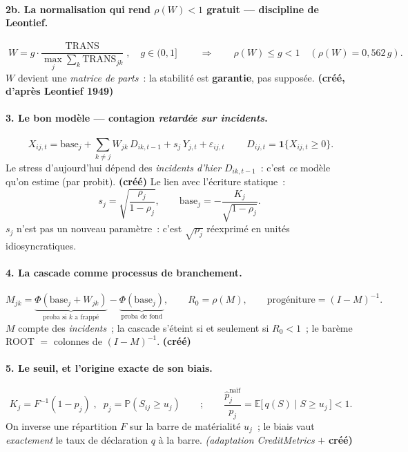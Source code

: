 \documentclass[11pt,a4paper]{article}
\newcommand{\Y}{Y}
\newcommand{\eps}{\varepsilon}
\begin{document}
\paragraph{2b. La normalisation qui rend $\rho(W)<1$ gratuit --- discipline de Leontief.}
\begin{equation}
\boxed{\;W = g\cdot\dfrac{\mathrm{TRANS}}{\max_j \sum_k \mathrm{TRANS}_{jk}}\;,\quad g\in(0,1]\;}
\qquad\Longrightarrow\qquad \rho(W) \le g < 1 \quad (\rho(W)=0{,}562\,g).
\end{equation}
$W$ devient une \emph{matrice de parts}~: la stabilité est \textbf{garantie}, pas supposée.
\textbf{(créé, d'après Leontief 1949)}

\paragraph{3. Le bon modèle --- contagion \emph{retardée sur incidents}.}
\begin{equation}
\boxed{\;X_{ij,t} = \text{base}_j + \sum_{k\neq j} W_{jk}\,D_{ik,t-1} + s_j\,\Y_{j,t} + \eps_{ij,t}\;}
\qquad D_{ij,t} = \mathbf 1\{X_{ij,t}\ge 0\}.
\end{equation}
Le stress d'aujourd'hui dépend des \emph{incidents d'hier} $D_{ik,t-1}$~: c'est \emph{ce}
modèle qu'on estime (par probit). \textbf{(créé)} Le lien avec l'écriture statique~:
\begin{equation}
s_j = \sqrt{\dfrac{\rho_j}{1-\rho_j}}, \qquad \text{base}_j = -\dfrac{K_j}{\sqrt{1-\rho_j}}.
\end{equation}
$s_j$ n'est pas un nouveau paramètre~: c'est $\sqrt{\rho_j}$ réexprimé en unités
idiosyncratiques.

\paragraph{4. La cascade comme processus de branchement.}
\begin{equation}
M_{jk} = \underbrace{\Phi(\text{base}_j + W_{jk})}_{\text{proba si } k \text{ a frappé}}
       - \underbrace{\Phi(\text{base}_j)}_{\text{proba de fond}}, \qquad
R_0 = \rho(M), \qquad \text{progéniture} = (I-M)^{-1}.
\end{equation}
$M$ compte des \emph{incidents}~; la cascade s'éteint si et seulement si $R_0<1$~; le barème
ROOT $=$ colonnes de $(I-M)^{-1}$. \textbf{(créé)}

\paragraph{5. Le seuil, et l'origine exacte de son biais.}
\begin{equation}
\boxed{\;K_j = F^{-1}(1-p_j)\;}, \;\; p_j = \mathbb P(S_{ij}\ge u_j)
\qquad ; \qquad
\frac{\hat p_j^{\text{naïf}}}{p_j} = \mathbb E\big[\,q(S)\mid S\ge u_j\,\big] < 1.
\end{equation}
On inverse une répartition $F$ sur la barre de matérialité $u_j$~; le biais vaut \emph{exactement}
le taux de déclaration $q$ à la barre. \emph{(adaptation CreditMetrics} $+$ \textbf{créé)}
\end{document}
